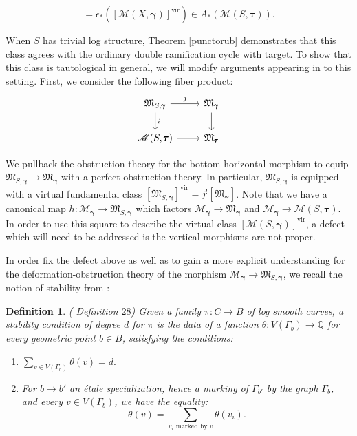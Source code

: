 \documentclass[12pt, oneside]{amsart}   	%
\newcounter{thm}
\newtheorem{definition}[thm]{Definition}
\newcommand{\vir}{\operatorname{vir}}
\numberwithin{equation}{section}
\numberwithin{thm}{section}
\numberwithin{figure}{section}
\begin{document}
\begin{equation}
[DR_{g,(a_i)}(S,\pmb\tau,L)] = \epsilon_*([\mathscr{M}(X,\pmb\gamma)]^{\vir}) \in A_*(\mathscr{M}(S,\pmb\tau)).
\end{equation}

When $S$ has trivial log structure, Theorem \ref{punctorub} demonstrates that this class agrees with the ordinary double ramification cycle with target. To show that this class is tautological in general, we will modify arguments appearing in \cite{BNtaut} to this setting. First, we consider the following fiber product:
\[\begin{tikzcd}
\mathfrak{M}_{S,\pmb\gamma} \arrow[r,"j"]\arrow[d,"i"] & \mathfrak{M}_{\pmb\gamma}\arrow{d}\\
\mathscr{M}(S,\pmb\tau) \arrow{r} & \mathfrak{M}_{\pmb\tau}
\end{tikzcd}\]

We pullback the obstruction theory for the bottom horizontal morphism to equip $\mathfrak{M}_{S,\pmb\gamma} \rightarrow \mathfrak{M}_{\pmb\gamma}$ with a perfect obstruction theory. In particular, $\mathfrak{M}_{S,\pmb\gamma}$ is equipped with a virtual fundamental class $[\mathfrak{M}_{S,\pmb\gamma}]^{\vir} = j^![\mathfrak{M}_{\pmb\gamma}]$. Note that we have a canonical map $h: \mathscr{M}_{\pmb\gamma} \rightarrow \mathfrak{M}_{S,\pmb\gamma}$ which factors $\mathscr{M}_{\pmb\gamma} \rightarrow \mathfrak{M}_{\pmb\gamma}$ and $\mathscr{M}_{\pmb\gamma} \rightarrow \mathscr{M}(S,\pmb\tau)$. In order to use this square to describe the virtual class $[\mathscr{M}(S,\pmb\gamma)]^{\vir}$, a defect which will need to be addressed is the vertical morphisms are not proper. 

In order fix the defect above as well as to gain a more explicit understanding for the deformation-obstruction theory of the morphism $\mathscr{M}_{\pmb\gamma} \rightarrow \mathfrak{M}_{S,\pmb\gamma}$, we recall the notion of stability from \cite{logDR}:



\begin{definition}{(\cite{logDR} Definition $28$)}
Given a family $\pi: C\rightarrow B$ of log smooth curves, a stability condition of degree $d$ for $\pi$ is the data of a function $\theta: V(\Gamma_b) \rightarrow \mathbb{Q}$ for every geometric point $b \in B$, satisfying the conditions:

\begin{enumerate}
\item $\sum_{v \in V(\Gamma_b)} \theta(v) = d.$
\item For $b \rightarrow b'$ an \'etale specialization, hence a marking of $\Gamma_{b'}$ by the graph $\Gamma_b$, and every $v \in V(\Gamma_b)$, we have the equality:
\[\theta(v) = \sum_{v_i\text{ marked by }v} \theta(v_i).\]

\end{enumerate}

\end{definition}
\end{document}
